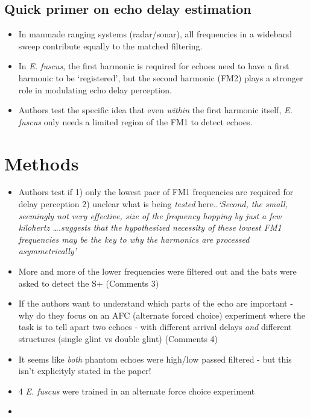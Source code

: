 \documentclass[
]{book}
\providecommand{\tightlist}{%
  \setlength{\itemsep}{0pt}\setlength{\parskip}{0pt}}
\begin{document}
\hypertarget{quick-primer-on-echo-delay-estimation}{%
\subsection{Quick primer on echo delay estimation}\label{quick-primer-on-echo-delay-estimation}}

\begin{itemize}
\tightlist
\item
  In manmade ranging systems (radar/sonar), all frequencies in a wideband sweep contribute equally to the matched filtering.
\item
  In \emph{E. fuscus}, the first harmonic is required for echoes need to have a first harmonic to be `registered', but the second harmonic (FM2) plays a stronger role in modulating echo delay perception.
\item
  Authors test the specific idea that even \emph{within} the first harmonic itself, \emph{E. fuscus} only needs a limited region of the FM1 to detect echoes.
\end{itemize}

\hypertarget{methods-9}{%
\section{Methods}\label{methods-9}}

\begin{itemize}
\item
  Authors test if 1) only the lowest paer of FM1 frequencies are required for delay perception 2) unclear what is being \emph{tested} here..\emph{`Second, the small, seemingly not very effective, size of the frequency hopping by just a few kilohertz \ldots.suggests that the hypothesized necessity of these lowest FM1 frequencies may be the key to why the harmonics are processed asymmetrically'}
\item
  More and more of the lower frequencies were filtered out and the bats were asked to detect the S+ (\protect\hypertarget{com_ming}{}{Comments 3})
\item
  If the authors want to understand which parts of the echo are important - why do they focus on an AFC (alternate forced choice) experiment where the task is to tell apart two echoes - with different arrival delays \emph{and} different structures (single glint vs double glint) (\protect\hypertarget{com_ming}{}{Comments 4})
\item
  It seems like \emph{both} phantom echoes were high/low passed filtered - but this isn't explicityly stated in the paper!
\item
  4 \emph{E. fuscus} were trained in an alternate force choice experiment
\item
\end{itemize}
\end{document}
